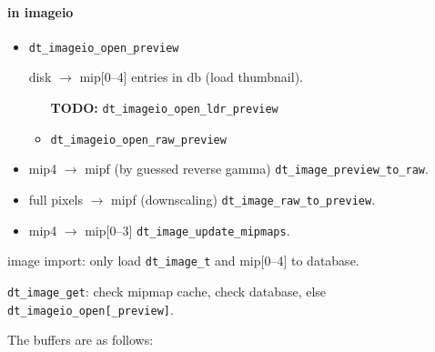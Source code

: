 \documentclass[a4paper,twoside]{scrartcl}
\newcommand{\todo}[1]{{\color{red}\bf TODO: #1}}
\newcommand{\code}[1]{\texttt{\color{codecol}#1}}
\begin{document}
\paragraph{in imageio}
\begin{itemize}
  \item \code{dt\_imageio\_open\_preview}

    disk $\rightarrow$ mip[0--4] entries in db (load thumbnail).
    \begin{itemize}
      \item[\todo{}]  \code{dt\_imageio\_open\_ldr\_preview}
      \item \code{dt\_imageio\_open\_raw\_preview}
    \end{itemize}
  \item mip4 $\rightarrow$ mipf (by guessed reverse gamma) \code{dt\_image\_preview\_to\_raw}.
  \item full pixels $\rightarrow$ mipf (downscaling) \code{dt\_image\_raw\_to\_preview}.
  \item mip4 $\rightarrow$ mip[0--3] \code{dt\_image\_update\_mipmaps}.
\end{itemize}

image import: only load \code{dt\_image\_t} and mip[0--4] to database.

\code{dt\_image\_get}: check mipmap cache, check database, else \code{dt\_imageio\_open[\_preview]}.

The buffers are as follows:
\end{document}
